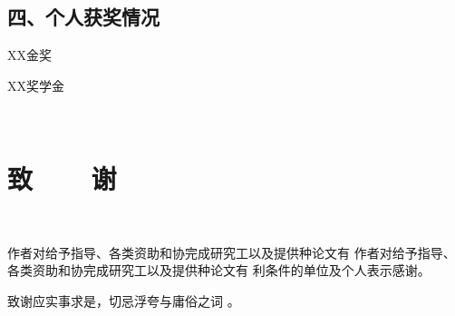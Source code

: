 \vspace{22pt}
\subsection*{四、个人获奖情况}
\begin{enumerate}[label={[\arabic*]},itemindent=2em,wide]
	\item XX金奖
	\item XX奖学金
\end{enumerate}
\fi

\newpage

\ifblindreview
\else

{~}
\vspace{-9pt}
\section{{致~~~~谢}} %
\renewcommand*{\baselinestretch}{1.0} %
\setlength{\baselineskip}{20pt} %
{~}
\vspace{-9pt}

作者对给予指导、各类资助和协完成研究工以及提供种论文有 作者对给予指导、各类资助和协完成研究工以及提供种论文有 利条件的单位及个人表示感谢。

致谢应实事求是，切忌浮夸与庸俗之词 。

\newpage
\fi